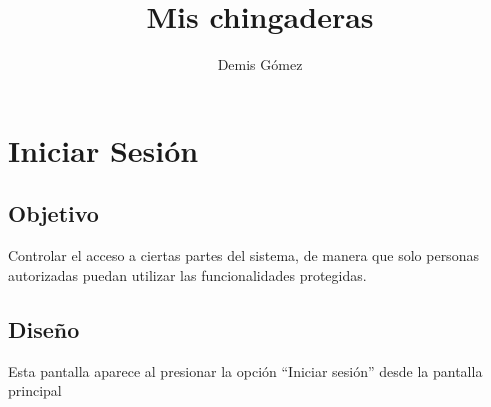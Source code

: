 \documentclass[]{article}
\title{Mis chingaderas}
\author{Demis Gómez}
\begin{document}
\maketitle


\section{Iniciar Sesión}
\subsection{Objetivo}
Controlar el acceso a ciertas partes del sistema, de manera que solo personas autorizadas puedan utilizar las funcionalidades protegidas.

\subsection{Diseño}
Esta pantalla aparece al presionar la opción ``Iniciar sesión'' desde la pantalla principal
\end{document}
